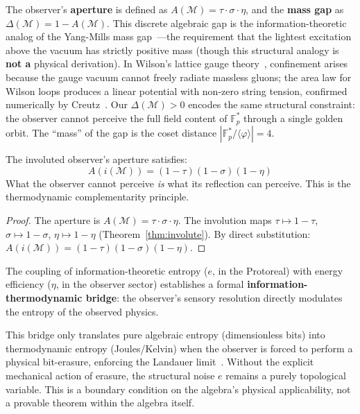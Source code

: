 The observer's \textbf{aperture} is defined as $A(\mathcal{M}) = \tau \cdot \sigma \cdot \eta$, and the \textbf{mass gap} as $\Delta(\mathcal{M}) = 1 - A(\mathcal{M})$. This discrete algebraic gap is the information-theoretic analog of the Yang-Mills mass gap~\cite{jaffe2000}---the requirement that the lightest excitation above the vacuum has strictly positive mass (though this structural analogy is \textbf{not a} physical derivation). In Wilson's lattice gauge theory~\cite{wilson1974}, confinement arises because the gauge vacuum cannot freely radiate massless gluons; the area law for Wilson loops produces a linear potential with non-zero string tension, confirmed numerically by Creutz~\cite{creutz1980}. Our $\Delta(\mathcal{M}) > 0$ encodes the same structural constraint: the observer cannot perceive the full field content of $\mathbb{F}_p^*$ through a single golden orbit. The ``mass'' of the gap is the coset distance $|\mathbb{F}_p^* / \langle\varphi\rangle| = 4$.

\begin{theorem}
The involuted observer's aperture satisfies:
\begin{equation}
    A(i(\mathcal{M})) = (1 - \tau)(1 - \sigma)(1 - \eta)
\end{equation}
What the observer cannot perceive \emph{is} what its reflection can perceive. This is the thermodynamic complementarity principle.
\end{theorem}
\begin{proof}
The aperture is $A(\mathcal{M}) = \tau \cdot \sigma \cdot \eta$. The involution maps $\tau \mapsto 1 - \tau$, $\sigma \mapsto 1 - \sigma$, $\eta \mapsto 1 - \eta$ (Theorem~\ref{thm:involute}). By direct substitution: $A(i(\mathcal{M})) = (1 - \tau)(1 - \sigma)(1 - \eta)$. \qedhere
\end{proof}

The coupling of information-theoretic entropy ($e$, in the Protoreal) with energy efficiency ($\eta$, in the observer sector) establishes a formal \textbf{information-thermodynamic bridge}: the observer's sensory resolution directly modulates the entropy of the observed physics. 

\begin{remark}
This bridge only translates pure algebraic entropy (dimensionless bits) into thermodynamic entropy (Joules/Kelvin) when the observer is forced to perform a physical bit-erasure, enforcing the Landauer limit~\cite{landauer61}. Without the explicit mechanical action of erasure, the structural noise $e$ remains a purely topological variable. This is a boundary condition on the algebra's physical applicability, not a provable theorem within the algebra itself.
\end{remark}

